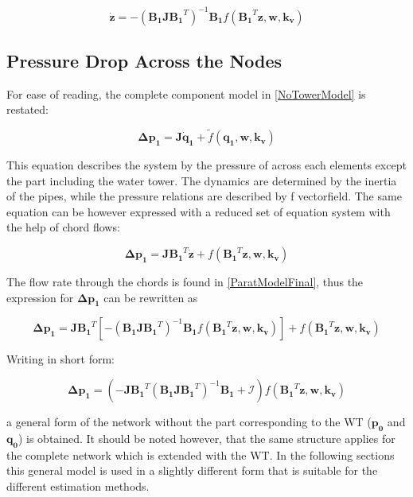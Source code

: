\begin{equation}
   \pmb{\dot{z}}  = - (\pmb{B_1 J {B_1}}^T)^{-1}\pmb{B_1} f({\pmb{B_1}}^T \pmb{z},\pmb{ w}, \pmb{k_v})
   \label{ParatModelFinal}
 \end{equation}

\subsection{Pressure Drop Across the Nodes}
\label{ModelRelationSection}

For ease of reading, the complete component model in \eqref{NoTowerModel} is restated: 

\begin{equation}
  \pmb{\Delta p_1} =  \pmb{J} \pmb{\dot{q}_1} + \tilde{f}(\pmb{q_1}, \pmb{w}, \pmb{k_v})
  \label{RecallModel}
\end{equation}

This equation describes the system by the pressure of across each elements except the part including the water tower. The dynamics are determined by the inertia of the pipes, while the pressure relations are described by f vectorfield. 
The same equation can be however expressed with a reduced set of equation system with the help of chord flows: 

\begin{equation}
  \pmb{\Delta p_1} =  \pmb{J {B_1}}^T \pmb{\dot{z}} + f({\pmb{B_1}}^T \pmb{z}, \pmb{w}, \pmb{k_v})
 \end{equation}

The flow rate through the chords is found in \eqref{ParatModelFinal}, thus the expression for $ \pmb{\Delta p_1} $ can be rewritten as

\begin{equation}
 \pmb{ \Delta p_1} = \pmb{ J {B_1}}^T [- (\pmb{B_1 J {B_1}}^T)^{-1}\pmb{B_1} f({\pmb{B_1}}^T \pmb{z},\pmb{ w}, \pmb{k_v})] + f({\pmb{B_1}}^T \pmb{z},\pmb{ w}, \pmb{k_v})
  \label{PressureLarge}
 \end{equation}
 
Writing in short form:
 
 \begin{equation}
  \pmb{\Delta p_1} =  (-\pmb{J {B_1}}^T (\pmb{B_1 J {B_1}}^T)^{-1}\pmb{B_1} + \pmb{\mathcal{I}}) f({\pmb{B_1}}^T \pmb{z}, \pmb{w}, \pmb{k_v})
  \label{PressureShort}
 \end{equation}

a general form of the network without the part corresponding to the WT ($\pmb{p_0}$ and $\pmb{q_0}$) is obtained. It should be noted however, that the same structure applies for the complete network which is extended with the WT. In the following sections this general model is used in a slightly different form that is suitable for the different estimation methods. 


